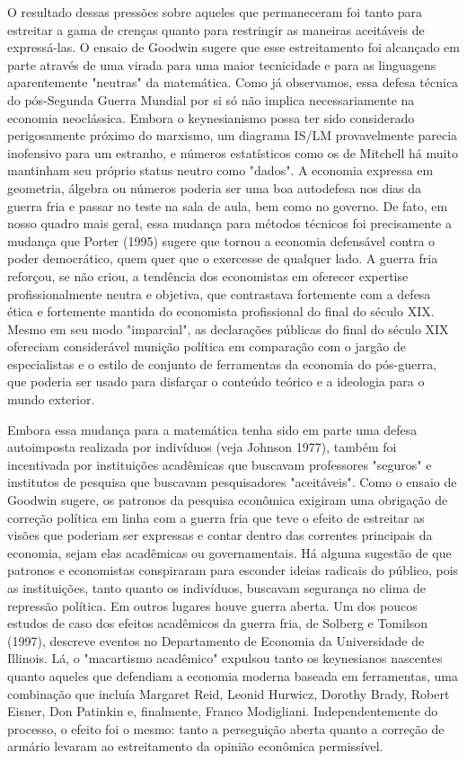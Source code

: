 \documentclass[12pt]{article}
\begin{document}
O resultado dessas pressões sobre aqueles que permaneceram foi tanto para estreitar a gama de crenças quanto para restringir as maneiras aceitáveis de expressá-las. O ensaio de Goodwin sugere que esse estreitamento foi alcançado em parte através de uma virada para uma maior tecnicidade e para as linguagens aparentemente "neutras" da matemática. Como já observamos, essa defesa técnica do pós-Segunda Guerra Mundial por si só não implica necessariamente na economia neoclássica. Embora o keynesianismo possa ter sido considerado perigosamente próximo do marxismo, um diagrama IS/LM provavelmente parecia inofensivo para um estranho, e números estatísticos como os de Mitchell há muito mantinham seu próprio status neutro como "dados". A economia expressa em geometria, álgebra ou números poderia ser uma boa autodefesa nos dias da guerra fria e passar no teste na sala de aula, bem como no governo. De fato, em nosso quadro mais geral, essa mudança para métodos técnicos foi precisamente a mudança que Porter (1995) sugere que tornou a economia defensável contra o poder democrático, quem quer que o exercesse de qualquer lado. A guerra fria reforçou, se não criou, a tendência dos economistas em oferecer expertise profissionalmente neutra e objetiva, que contrastava fortemente com a defesa ética e fortemente mantida do economista profissional do final do século XIX. Mesmo em seu modo "imparcial", as declarações públicas do final do século XIX ofereciam considerável munição política em comparação com o jargão de especialistas e o estilo de conjunto de ferramentas da economia do pós-guerra, que poderia ser usado para disfarçar o conteúdo teórico e a ideologia para o mundo exterior.

Embora essa mudança para a matemática tenha sido em parte uma defesa autoimposta realizada por indivíduos (veja Johnson 1977), também foi incentivada por instituições acadêmicas que buscavam professores "seguros" e institutos de pesquisa que buscavam pesquisadores "aceitáveis". Como o ensaio de Goodwin sugere, os patronos da pesquisa econômica exigiram uma obrigação de correção política em linha com a guerra fria que teve o efeito de estreitar as visões que poderiam ser expressas e contar dentro das correntes principais da economia, sejam elas acadêmicas ou governamentais. Há alguma sugestão de que patronos e economistas conspiraram para esconder ideias radicais do público, pois as instituições, tanto quanto os indivíduos, buscavam segurança no clima de repressão política. Em outros lugares houve guerra aberta. Um dos poucos estudos de caso dos efeitos acadêmicos da guerra fria, de Solberg e Tomilson (1997), descreve eventos no Departamento de Economia da Universidade de Illinois. Lá, o "macartismo acadêmico" expulsou tanto os keynesianos nascentes quanto aqueles que defendiam a economia moderna baseada em ferramentas, uma combinação que incluía Margaret Reid, Leonid Hurwicz, Dorothy Brady, Robert Eisner, Don Patinkin e, finalmente, Franco Modigliani. Independentemente do processo, o efeito foi o mesmo: tanto a perseguição aberta quanto a correção de armário levaram ao estreitamento da opinião econômica permissível.
\end{document}
